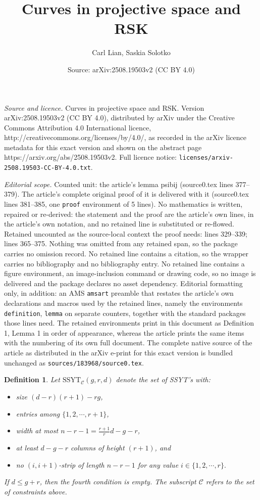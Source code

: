 \documentclass[10pt,a4paper]{amsart}
\title{Curves in projective space and RSK}
\author{Carl Lian, Saskia Solotko}
\date{Source: arXiv:2508.19503v2 (CC BY 4.0)}
\newtheorem{definition}{Definition}
\begin{document}
\maketitle

\noindent\emph{Source and licence.} Curves in projective space and RSK. Version arXiv:2508.19503v2 (CC BY 4.0), distributed by arXiv under the Creative Commons Attribution 4.0 International licence, http://creativecommons.org/licenses/by/4.0/, as recorded in the arXiv licence metadata for this exact version and shown on the abstract page https://arxiv.org/abs/2508.19503v2. Full licence notice: \texttt{licenses/arxiv-2508.19503-CC-BY-4.0.txt}.\par\smallskip

\noindent\textit{Editorial scope.} Counted unit: the article's lemma psibij (source0.tex lines 377--379). The article's complete original proof of it is delivered with it (source0.tex lines 381--385, one \texttt{proof} environment of 5 lines). No mathematics is written, repaired or re-derived: the statement and the proof are the article's own lines, in the article's own notation, and no retained line is substituted or re-flowed.  Retained uncounted as the source-local context the proof needs: lines 329--339; lines 365--375.  Nothing was omitted from any retained span, so the package carries no omission record.  No retained line contains a citation, so the wrapper carries no bibliography and no bibliography entry.  No retained line contains a figure environment, an image-inclusion command or drawing code, so no image is delivered and the package declares no asset dependency.  Editorial formatting only, in addition: an AMS \texttt{amsart} preamble that restates the article's own declarations and macros used by the retained lines, namely the environments \texttt{definition}, \texttt{lemma} on separate counters, together with the standard packages those lines need.  The retained environments print in this document as Definition 1, Lemma 1 in order of appearance, whereas the article prints the same items with the numbering of its own full document.  The complete native source of the article as distributed in the arXiv e-print for this exact version is bundled unchanged as \texttt{sources/183968/source0.tex}.
\begin{definition}\label{cdef}
    Let $\text{SSYT}_\mathcal{C}(g,r,d)$ denote the set of SSYT's with:
    \begin{itemize}
    \item  size $(d-r)(r+1)-rg$,
    \item  entries among $\{1,2,\cdots, r+1\}$,
    \item  width at most $n-r-1=\frac{r+1}{r}d-g-r$,
    \item  at least $d-g-r$ columns of height $(r+1)$, and
    \item  no $(i,i+1)$-strip of length $n-r-1$ for any value $i\in \{1,2,\cdots, r\}.$
    \end{itemize}
If $d\le g+r$, then the fourth condition is empty. The subscript $\mathcal{C}$ refers to the set of constraints above.
\end{definition}
\end{document}
